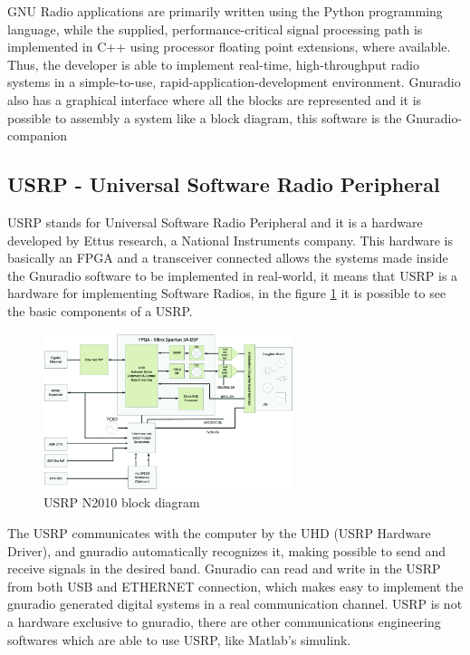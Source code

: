 GNU Radio applications are primarily written using the Python programming
language, while the supplied, performance-critical signal processing path is
implemented in C++ using processor floating point extensions, where available.
Thus, the developer is able to implement real-time, high-throughput radio
systems in a simple-to-use, rapid-application-development environment. Gnuradio
also has a graphical interface where all the blocks are represented and it is
possible to assembly a system like a block diagram, this software is the
Gnuradio-companion\\

\subsection{USRP - Universal Software Radio Peripheral}

USRP stands for Universal Software Radio Peripheral and it is a hardware
developed by Ettus research, a National Instruments company. This hardware is
basically an FPGA and a transceiver connected allows the systems made inside the
Gnuradio software to be implemented in real-world, it means that USRP is a
hardware for implementing Software Radios, in the figure \ref{fig:usrpbd} it is
possible to see the basic components of a USRP.\\

\begin{figure}[htbp]
    \centering
    \includegraphics[width=0.65\textwidth]{./figures/usrp_bd}
    \caption{ USRP N2010 block diagram
    \label{fig:usrpbd}}
\end{figure}

The USRP communicates with the computer by the UHD (USRP Hardware Driver), and
gnuradio automatically recognizes it, making possible to send and receive
signals in the desired band. Gnuradio can read and write in the USRP from both
USB and ETHERNET connection, which makes easy to implement the gnuradio
generated digital systems in a real communication channel. USRP is not a
hardware exclusive to gnuradio, there are other communications engineering
softwares which are able to use USRP, like Matlab's simulink.\\

